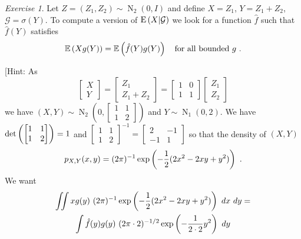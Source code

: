 \documentclass[12pt,a4paper]{amsart}
\newcommand{\gaussian}[3]{\operatorname{N}_{#1}\left(#2,#3\right)}
\theoremstyle{plain}%
\theoremstyle{definition}
\theoremstyle{remark}
\newtheorem{exercise}{Exercise}
\begin{document}
\begin{exercise}
Let $Z = (Z_1,Z_2) \sim \gaussian 2 0 I$ and define $X = Z_1$, $Y = Z_1+ Z_2$, $\mathcal G = \sigma(Y)$. To compute a version of $\operatorname{E}\left(X \middle| \mathcal G\right)$ we look for a function $\hat f$ such that $\hat f(Y)$ satisfies
\begin{equation*}
  \expectof{X g(Y)} = \expectof{\hat f(Y) g(Y)} \quad \text{for all bounded $g$} \ .
\end{equation*}

[Hint: As 
\begin{equation*}
  \begin{bmatrix}
  X \\ Y
\end{bmatrix} =
\begin{bmatrix}
  Z_1 \\ Z_1 + Z_2
\end{bmatrix} =
\begin{bmatrix}
  1 & 0 \\ 1 & 1
\end{bmatrix}
\begin{bmatrix}
  Z_1 \\ Z_2
\end{bmatrix}
\end{equation*}
we have $(X,Y) \sim \gaussian 2 0 {
  \begin{bmatrix}
    1 & 1 \\ 1 & 2
  \end{bmatrix}}$
and $Y \sim \gaussian 1 0 2$. We have $\operatorname{det}\left( \begin{bmatrix}
    1 & 1 \\ 1 & 2
  \end{bmatrix}\right) = 1$ and $ \begin{bmatrix}
    1 & 1 \\ 1 & 2
  \end{bmatrix}^{-1} =
  \begin{bmatrix}
    2 & -1 \\ -1 & 1
  \end{bmatrix}$ so that the density of $(X,Y)$
  \begin{equation*}
    p_{X,Y}(x,y)=(2\pi)^{-1} \exp\left(-\frac12(2x^2 - 2xy + y^2)\right) \ .
  \end{equation*}
  We want
  \begin{multline*}
    \iint x g(y) \ (2\pi)^{-1} \expof{-\frac12(2x^2 - 2xy + y^2)} \ dx \ dy = \\  \int \hat f(y)g(y) \ (2\pi \cdot 2)^{-1/2} \expof{-\frac 1 {2 \cdot 2} y^2} \ dy 
  \end{multline*}

\end{exercise}
\end{document}
